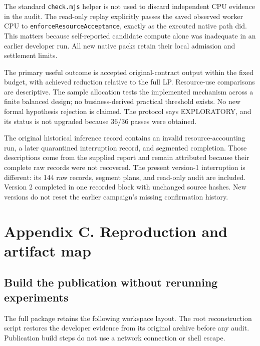 The standard \texttt{check.mjs} helper is not used to discard
independent CPU evidence in the audit. The read-only replay explicitly
passes the saved observed worker CPU to
\texttt{enforceResourceAcceptance}, exactly as the executed native path
did. This matters because self-reported candidate compute alone was
inadequate in an earlier developer run. All new native packs retain
their local admission and settlement limits.

The primary useful outcome is accepted original-contract output within
the fixed budget, with achieved reduction relative to the full LP.
Resource-use comparisons are descriptive. The sample allocation tests
the implemented mechanism across a finite balanced design; no
business-derived practical threshold exists. No new formal hypothesis
rejection is claimed. The protocol says EXPLORATORY, and its status is
not upgraded because 36/36 passes were obtained.

The original historical inference record contains an invalid
resource-accounting run, a later quarantined interruption record, and
segmented completion. Those descriptions come from the supplied report
and remain attributed because their complete raw records were not
recovered. The present version-1 interruption is different: its 144 raw
records, segment plans, and read-only audit are included. Version 2
completed in one recorded block with unchanged source hashes. New
versions do not reset the earlier campaign's missing confirmation
history.

\clearpage

\section*{Appendix C. Reproduction and artifact
map}\label{appendix-reproduction}

\subsection*{Build the publication without rerunning
experiments}\label{build-the-publication-without-rerunning-experiments}

The full package retains the following workspace layout. The root
reconstruction script restores the developer evidence from its original
archive before any audit. Publication build steps do not use a network
connection or shell escape.

